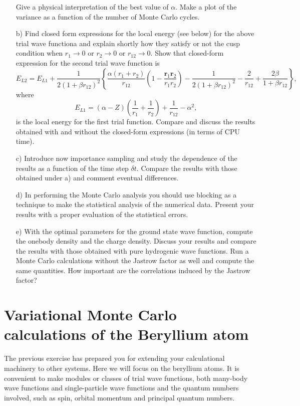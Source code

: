 \documentclass[10pt]{article}
\begin{document}
\begin{enumerate}
Give a physical  interpretation of the best value of $\alpha$.
Make a plot of the variance as a function of the number of Monte Carlo
cycles.
\item[b)]
Find closed form expressions for the local energy (see below) for the above 
trial wave functiona and explain shortly how they 
satisfy or not 
the cusp condition when $r_1\rightarrow 0$ or
$r_2\rightarrow 0$ or  $r_{12}\rightarrow 0$. Show that
closed-form expression for the second trial wave function is
\[ 
E_{L2} = E_{L1}+\frac{1}{2(1+\beta r_{12})^2}\left\{\frac{\alpha(r_1+r_2)}{r_{12}}(1-\frac{\mathbf{r}_1\mathbf{r}_2}{r_1r_2})-\frac{1}{2(1+\beta r_{12})^2}-\frac{2}{r_{12}}+\frac{2\beta}{1+\beta r_{12}}\right\},
\]
where
\[ 
E_{L1} = \left(\alpha-Z\right)\left(\frac{1}{r_1}+\frac{1}{r_2}\right)+\frac{1}{r_{12}}-\alpha^2,
\]
is the local energy for the first trial function.
Compare and discuss the results obtained  with and without the closed-form expressions (in terms of CPU time).
\item[c)] Introduce now importance sampling and study the dependence of the results as a function of the time step $\delta t$.  
Compare the results with those obtained under a) and comment eventual differences.

\item[d)] In performing the Monte Carlo analysis you should use blocking as a technique  to make the statistical analysis of the numerical data. Present your results with a proper evaluation of the statistical errors.
\item[e)]  With the optimal parameters for the ground state wave function, compute the onebody density and
the charge density. Discuss your results and compare the results with those obtained with pure hydrogenic wave functions. Run a Monte Carlo calculations without the Jastrow factor as well
and compute the same quantities. How important are the correlations induced by the Jastrow factor?

\end{enumerate}


\section*{Variational Monte Carlo calculations of the Beryllium atom}
The previous exercise has prepared you for extending your calculational machinery  to other systems.
Here we will focus on the  beryllium atoms.
It is convenient to make modules or classes of trial wave functions, both many-body wave functions
and single-particle wave functions  and the quantum numbers  involved, such as spin, orbital momentum and principal
quantum numbers.
\end{document}
